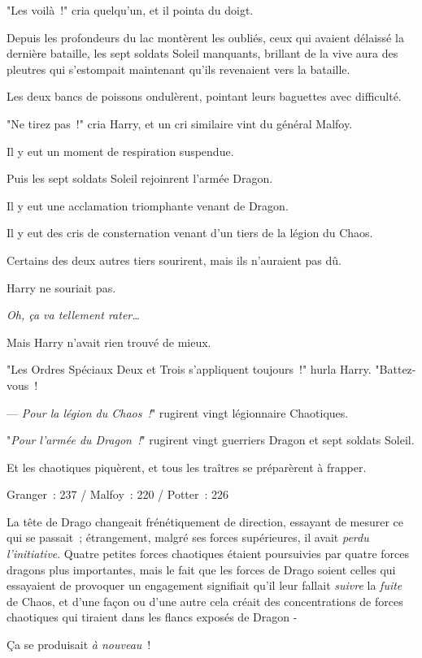 "Les voilà~!" cria quelqu'un, et il pointa du doigt.

Depuis les profondeurs du lac montèrent les oubliés, ceux qui avaient délaissé la dernière bataille, les sept soldats Soleil manquants, brillant de la vive aura des pleutres qui s'estompait maintenant qu'ils revenaient vers la bataille.

Les deux bancs de poissons ondulèrent, pointant leurs baguettes avec difficulté.

"Ne tirez pas~!" cria Harry, et un cri similaire vint du général Malfoy.

Il y eut un moment de respiration suspendue.

Puis les sept soldats Soleil rejoinrent l'armée Dragon.

Il y eut une acclamation triomphante venant de Dragon.

Il y eut des cris de consternation venant d'un tiers de la légion du Chaos.

Certains des deux autres tiers sourirent, mais ils n'auraient pas dû.

Harry ne souriait pas.

\emph{Oh, ça va tellement rater…}

Mais Harry n'avait rien trouvé de mieux.

"Les Ordres Spéciaux Deux et Trois s'appliquent toujours~!" hurla Harry. "Battez-vous~!

--- \emph{Pour la légion du Chaos~!}" rugirent vingt légionnaire Chaotiques.

"\emph{Pour l'armée du Dragon~!}" rugirent vingt guerriers Dragon et sept soldats Soleil.

Et les chaotiques piquèrent, et tous les traîtres se préparèrent à frapper.

Granger~: 237 / Malfoy~: 220 / Potter~: 226

\later

La tête de Drago changeait frénétiquement de direction, essayant de mesurer ce qui se passait~; étrangement, malgré ses forces supérieures, il avait \emph{perdu l'initiative}. Quatre petites forces chaotiques étaient poursuivies par quatre forces dragons plus importantes, mais le fait que les forces de Drago soient celles qui essayaient de provoquer un engagement signifiait qu'il leur fallait \emph{suivre} la \emph{fuite} de Chaos, et d'une façon ou d'une autre cela créait des concentrations de forces chaotiques qui tiraient dans les flancs exposés de Dragon -

Ça se produisait \emph{à nouveau}~!

